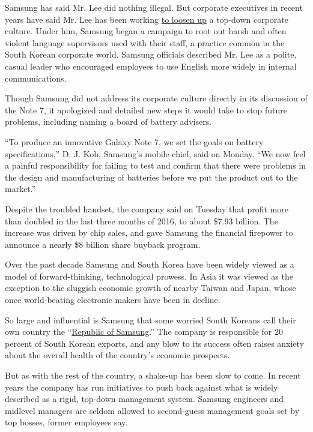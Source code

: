 Samsung has said Mr. Lee did nothing illegal. But corporate executives
in recent years have said Mr. Lee has been working
\href{https://www.nytimes.com/2017/01/16/business/lee-jae-yong-samsung.html}{to
loosen up} a top-down corporate culture. Under him, Samsung began a
campaign to root out harsh and often violent language supervisors used
with their staff, a practice common in the South Korean corporate world.
Samsung officials described Mr. Lee as a polite, casual leader who
encouraged employees to use English more widely in internal
communications.

Though Samsung did not address its corporate culture directly in its
discussion of the Note 7, it apologized and detailed new steps it would
take to stop future problems, including naming a board of battery
advisers.

``To produce an innovative Galaxy Note 7, we set the goals on battery
specifications,'' D. J. Koh, Samsung's mobile chief, said on Monday.
``We now feel a painful responsibility for failing to test and confirm
that there were problems in the design and manufacturing of batteries
before we put the product out to the market.''

Despite the troubled handset, the company said on Tuesday that profit
more than doubled in the last three months of 2016, to about \$7.93
billion. The increase was driven by chip sales, and gave Samsung the
financial firepower to announce a nearly \$8 billion share buyback
program.

Over the past decade Samsung and South Korea have been widely viewed as
a model of forward-thinking, technological prowess. In Asia it was
viewed as the exception to the sluggish economic growth of nearby Taiwan
and Japan, whose once world-beating electronic makers have been in
decline.

So large and influential is Samsung that some worried South Koreans call
their own country the
``\href{https://www.nytimes.com/2016/10/23/world/asia/galaxy-note-7-recall-south-korea-samsung.html}{Republic
of Samsung}.'' The company is responsible for 20 percent of South Korean
exports, and any blow to its success often raises anxiety about the
overall health of the country's economic prospects.

But as with the rest of the country, a shake-up has been slow to come.
In recent years the company has run initiatives to push back against
what is widely described as a rigid, top-down management system. Samsung
engineers and midlevel managers are seldom allowed to second-guess
management goals set by top bosses, former employees say.


